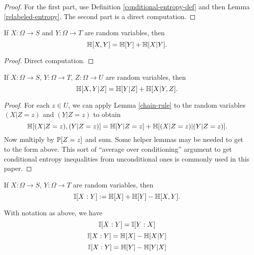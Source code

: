 \begin{proof}
  \leanok
  For the first part, use Definition \ref{conditional-entropy-def} and then Lemma \ref{relabeled-entropy}.  The second part is a direct computation.
\end{proof}


\begin{lemma}\label{chain-rule}
  \leanok
  If $X: \Omega \to S$ and $Y: \Omega \to T$ are random variables, then
  $$ \mathbb{H}[X, Y] = \mathbb{H}[Y] + \mathbb{H}[X|Y].$$
  \end{lemma}
  \begin{proof}
  \leanok
  Direct computation.
\end{proof}

\begin{lemma}\label{conditional-chain-rule}
  \leanok
  If $X: \Omega \to S$, $Y: \Omega \to T$, $Z: \Omega \to U$ are random variables, then
$$ \mathbb{H}[X, Y | Z ] = \mathbb{H}[Y | Z] + \mathbb{H}[X|Y, Z].$$
\end{lemma}

\begin{proof}  \leanok
   For each $z \in U$, we can apply Lemma \ref{chain-rule} to the random variables $(X|Z=z)$ and $(Y|Z=z)$ to obtain
  $$ \mathbb{H}[ (X|Z=z),(Y|Z=z) ] = \mathbb{H}[Y|Z=z] + \mathbb{H}[(X|Z=z)|(Y|Z=z)].$$
  Now multiply by $\mathbb{P}[Z=z]$ and sum.  Some helper lemmas may be needed to get to the form above.  This sort of ``average over conditioning'' argument to get conditional entropy inequalities from unconditional ones is commonly used in this paper.
\end{proof}

\begin{definition}
  \label{information-def}
  \leanok
  If $X: \Omega \to S$, $Y: \Omega \to T$ are random variables, then
  $$\mathbb{I}[X : Y] := \mathbb{H}[X] + \mathbb{H}[Y] - \mathbb{H}[X,Y].$$
\end{definition}

\begin{lemma}
  \label{alternative-mutual}
  \leanok
  With notation as above, we have
  $$  \mathbb{I}[X : Y] = \mathbb{I}[Y:X]$$
  $$  \mathbb{I}[X : Y] = \mathbb{H}[X] - \mathbb{H}[X|Y]$$
  $$  \mathbb{I}[X : Y] = \mathbb{H}[Y] - \mathbb{H}[Y|X]$$
\end{lemma}

